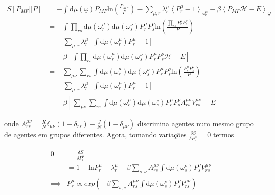 \documentclass[a4paper, 11pt]{article} %
\begin{document}
\begin{equation}
    \begin{split}
        S[P_{MF}||P] & = -\int
    \mathrm{d}\mu(\underline\omega)P_{MF}\mathrm{ln}(\frac{P_{MF}}{P})
    -\sum_{\mu,r}\lambda_r^{\mu}\left<P^{\mu}_r-1\right>_{\omega^{\mu}_r} 
    - \beta\left<P_{MF}\mathcal{H} - E\right>_{\underline\omega} \\
    & =  -\int
    \prod_{rs}\mathrm{d}\mu(\omega^{\mu}_r)\mathrm{d}\mu(\omega^{\nu}_s)
    P^{\mu}_rP^{\nu}_s\mathrm{ln}(\frac{\prod_{rs}P^{\mu}_rP^{\nu}_s}
    {P}) \\
    &\quad -\sum_{\mu,r}\lambda_r^{\mu}\left[\int \mathrm{d}\mu(\omega^{\mu}_r)
        P^{\mu}_r-1\right] \\
    &\quad - \beta\left[\int\prod_{rs}\mathrm{d}\mu(\omega^{\mu}_r)
        \mathrm{d}\mu(\omega^{\nu}_s)P^{\mu}_rP^{\nu}_s\mathcal{H}-E\right]\\
    & =  -\sum_{\mu\nu}\sum_{rs}\int
        \mathrm{d}\mu(\omega^{\mu}_r)\mathrm{d}\mu(\omega^{\nu}_s)
    P^{\mu}_rP^{\nu}_s\mathrm{ln}(\frac{P^{\mu}_rP^{\nu}_s}
    {P}) \\
    &\quad -\sum_{\mu,r}\lambda_r^{\mu}\left[\int \mathrm{d}\mu(\omega^{\mu}_r)
        P^{\mu}_r-1\right] \\
    &\quad - \beta\left[\sum_{\mu\nu}\sum_{rs}\int\mathrm{d}\mu(\omega^{\mu}_r)
    \mathrm{d}\mu(\omega^{\nu}_s)P^{\mu}_rP^{\nu}_sA_{rs}^{\mu\nu}
    V_{rs}^{\mu\nu}-E\right]
    \end{split}
\end{equation}

onde $A_{rs}^{\mu\nu} = \frac{K}{N}\delta_{\mu\nu}(1-\delta_{rs}) - 
\frac{J}{N}(1-\delta_{\mu\nu})$
discrimina agentes num mesmo grupo de agentes em grupos diferentes. Agora,
tomando variações $\frac{\delta S}{\delta{P^{\mu}_r}} = 0$ termos

\begin{equation}\label{mean-field-p}
    \begin{split}
        0 & = \frac{\delta S}{\delta P^{\mu}_r} \\
          & = 1 - \mathrm{ln}P^{\mu}_r - \lambda_r^{\mu} 
        - \beta\sum_{s,\nu}A_{rs}^{\mu\nu}\int\mathrm{d}\mu(\omega^{\nu}_s)
            P^{\nu}_sV_{rs}^{\mu\nu} \\
        \implies & P_r^{\mu} \propto exp\left(
        - \beta\sum_{s,\nu}A_{rs}^{\mu\nu}\int\mathrm{d}\mu(\omega^{\nu}_s)
    P^{\nu}_sV_{rs}^{\mu\nu} \right)
    \end{split}
\end{equation}
\end{document}
